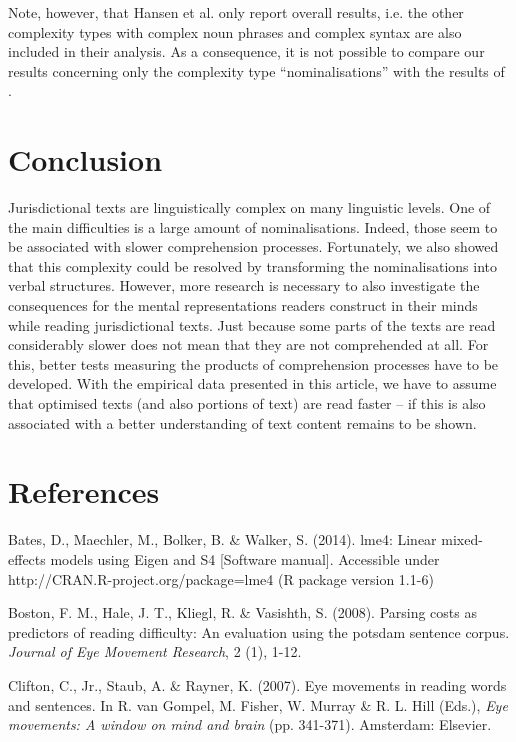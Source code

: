 \documentclass[output=paper]{langsci/langscibook}
\begin{document}
Note, however, that Hansen et al. only report overall results, i.e. the other complexity types with complex noun phrases and complex syntax are also included in their analysis. As a consequence, it is not possible to compare our results concerning only the complexity type “nominalisations” with the results of \citet{HansenEtAl2006}. 

\section{Conclusion}

Jurisdictional texts are linguistically complex on many linguistic levels. One of the main difficulties is a large amount of nominalisations. Indeed, those seem to be associated with slower comprehension processes. Fortunately, we also showed that this complexity could be resolved by transforming the nominalisations into verbal structures. However, more research is necessary to also investigate the consequences for the mental representations readers construct in their minds while reading jurisdictional texts. Just because some parts of the texts are read considerably slower does not mean that they are not comprehended at all. For this, better tests measuring the products of comprehension processes have to be developed. With the empirical data presented in this article, we have to assume that optimised texts (and also portions of text) are read faster – if this is also associated with a better understanding of text content remains to be shown.

\section{References}


Bates, D., Maechler, M., Bolker, B. \& Walker, S. (2014). lme4: Linear mixed-effects models using Eigen and S4 [Software manual]. Accessible under http://CRAN.R-project.org/package=lme4 (R package version 1.1-6)



Boston, F. M., Hale, J. T., Kliegl, R. \& Vasishth, S. (2008). Parsing costs as predictors of reading difficulty: An evaluation using the potsdam sentence corpus. \textit{Journal of Eye Movement Research}, 2 (1), 1-12.



Clifton, C., Jr., Staub, A. \& Rayner, K. (2007). Eye movements in reading words and sentences. In R. van Gompel, M. Fisher, W. Murray \& R. L. Hill (Eds.), \textit{Eye movements: A window on mind and brain} (pp. 341-371). Amsterdam: Elsevier.
\end{document}
